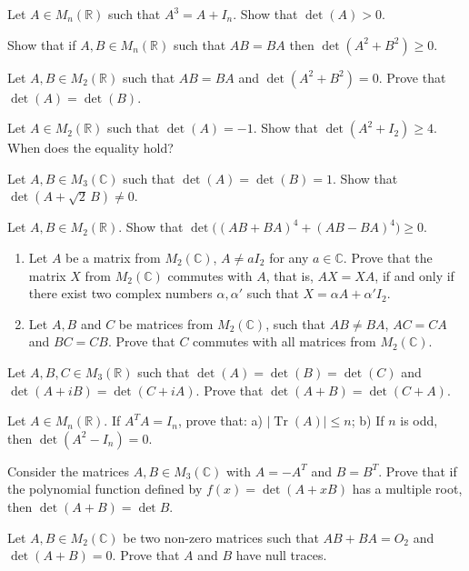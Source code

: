 \documentclass[12pt]{article}
\begin{document}
\begin{problems}
\item Let $A\in M_n(\mathbb{R})$ such that $A^3=A+I_n$. Show that $\det(A)>0$.

\item Show that if $A,B\in M_n(\mathbb{R})$ such that $AB=BA$ then $\det(A^2+B^2)\ge 0$.

\item Let $A,B\in M_2(\mathbb{R})$ such that $AB=BA$ and $\det(A^2+B^2)=0$. Prove that $\det(A)=\det(B)$.

\item Let $A\in M_2(\mathbb{R})$ such that $\det(A)=-1$. Show that $\det(A^2+I_2)\ge 4$. When does the equality hold?

\item Let $A,B\in M_3(\mathbb{C})$ such that $\det(A)=\det(B)=1$. Show that $\det(A+\sqrt2\,B)\ne 0$.

\item Let $A,B\in M_2(\mathbb{R})$. Show that $\det\big((AB+BA)^4+(AB-BA)^4\big) \ge 0$.

\item
\begin{enumerate}[label=(\alph*)]
\item Let $A$ be a matrix from $M_2(\mathbb{C})$, $A\ne aI_2$ for any $a\in\mathbb{C}$. Prove that the matrix $X$ from $M_2(\mathbb{C})$ commutes with $A$, that is, $AX=XA$, if and only if there exist two complex numbers $\alpha,\alpha'$ such that $X=\alpha A+\alpha' I_2$.
\item Let $A,B$ and $C$ be matrices from $M_2(\mathbb{C})$, such that $AB\ne BA$, $AC=CA$ and $BC=CB$. Prove that $C$ commutes with all matrices from $M_2(\mathbb{C})$.
\end{enumerate}

\item Let $A,B,C\in M_3(\mathbb{R})$ such that $\det(A)=\det(B)=\det(C)$ and $\det(A+iB)=\det(C+iA)$. Prove that $\det(A+B)=\det(C+A)$.

\item Let $A\in M_n(\mathbb{R})$. If $A^TA=I_n$, prove that: a) $|\operatorname{Tr}(A)|\le n$; b) If $n$ is odd, then $\det(A^2-I_n)=0$.

\item Consider the matrices $A,B\in M_3(\mathbb{C})$ with $A=-A^T$ and $B=B^T$. Prove that if the polynomial function defined by $f(x)=\det(A+xB)$ has a multiple root, then $\det(A+B)=\det B$.

\item Let $A,B\in M_2(\mathbb{C})$ be two non-zero matrices such that $AB+BA=O_2$ and $\det(A+B)=0$. Prove that $A$ and $B$ have null traces.


\end{problems}
\end{document}
